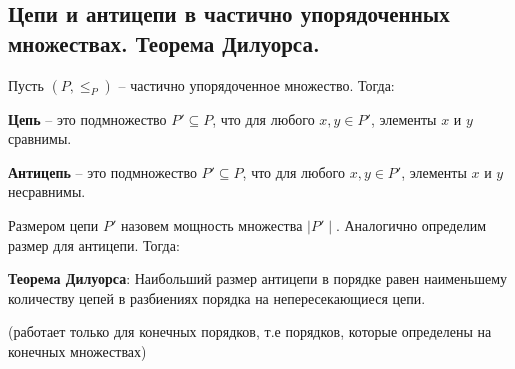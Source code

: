 \subsection{Цепи и антицепи в частично упорядоченных множествах. Теорема Дилуорса.}

Пусть $(P, \le_P)$ -- частично упорядоченное множество. Тогда:

\textbf{Цепь} -- это подмножество $P' \subseteq P$, что для любого $x, y \in P'$, элементы $x$ и $y$ сравнимы.

\textbf{Антицепь} -- это подмножество $P' \subseteq P$, что для любого $x, y \in P'$, элементы $x$ и $y$ несравнимы.

Размером цепи $P'$ назовем мощность множества $\mid P' \mid$. Аналогично определим размер для антицепи. Тогда:

\textbf{Теорема Дилуорса}: Наибольший размер антицепи в порядке равен наименьшему количеству цепей в разбиениях порядка на непересекающиеся цепи.

(работает только для конечных порядков, т.е порядков, которые определены на конечных множествах)

